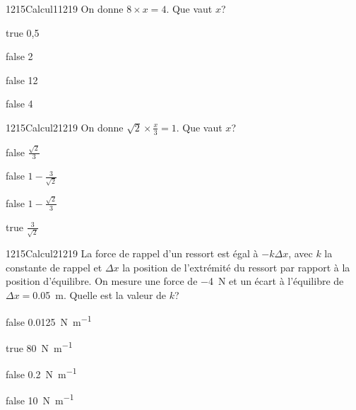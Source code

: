             \begin{question}{1215}{Calcul}{1}{1219}
                On donne $8\times x=4$. Que vaut $x$?
            \end{question}
            \begin{reponses}
                \item[true] 0,5
                \item[false] 2
                \item[false] 12
                \item[false] 4
            \end{reponses}
        	\begin{question}{1215}{Calcul}{2}{1219}
				On donne $\sqrt{2} \times \frac{x}{3}=1$. Que vaut $x$?
            \end{question}
            \begin{reponses}
            	\item[false] $\frac{\sqrt{2}}{3}$
            	\item[false] $1-\frac{3}{\sqrt{2}}$
                \item[false] $1-\frac{\sqrt{2}}{3}$
                \item[true] $\frac{3}{\sqrt{2}}$
            \end{reponses}
            \begin{question}{1215}{Calcul}{2}{1219}
                La force de rappel d'un ressort est égal à $-k\Delta x$, avec $k$ la constante de rappel et $\Delta x$ la position de l'extrémité du ressort par rapport à la position d'équilibre. On mesure une force de \SI{-4}{\newton} et un écart à l'équilibre de $\Delta x=$\SI{0,05}{\meter}. Quelle est la valeur de $k$?
            \end{question}
            \begin{reponses}
                \item[false] \SI{0,0125}{\newton\per\meter}
                \item[true] \SI{80}{\newton\per\meter}
                \item[false] \SI{0,2}{\newton\per\meter}
                \item[false] \SI{10}{\newton\per\meter}
            \end{reponses}
